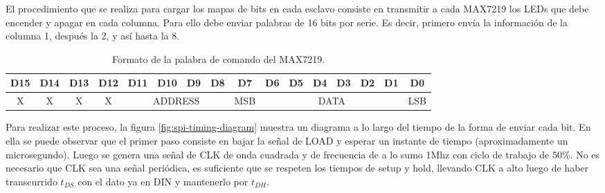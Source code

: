 El procedimiento que se realiza para cargar los mapas de bits en cada esclavo consiste en transmitir a cada MAX7219 los LEDs que debe encender y apagar en cada columna. Para ello debe enviar palabras de 16 bits por serie. Es decir, primero envía la información de la columna 1, después la 2, y así hasta la 8.

\begin{table}[ht!]
	\centering
	\caption{Formato de la palabra de comando del MAX7219.}
	\label{table:trama-spi}
	\begin{adjustbox}{max width=\textwidth}
	\begin{tabular}{|c|c|c|c|c|c|c|c|c|c|c|c|c|c|c|c|}
	\hline
	D15 & D14 & D13 & D12 & D11   & D10   & D9   & D8   & D7 & D6 & D5 & D4 & D3 & D2 & D1 & D0 \\ \hline
	X   & X   & X   & X   & \multicolumn{4}{c|}{ADDRESS} & \multicolumn{1}{c}{ MSB } & \multicolumn{6}{c}{ DATA } & \multicolumn{1}{c|}{ LSB } \\ \hline
	\end{tabular}
	\end{adjustbox}
\end{table}

Para realizar este proceso, la figura \ref{fig:spi-timing-diagram} muestra un diagrama a lo largo del tiempo de la forma de enviar cada bit. En ella se puede observar que el primer paso consiste en bajar la señal de LOAD y esperar un instante de tiempo (aproximadamente un microsegundo). Luego se genera una señal de CLK de onda cuadrada y de frecuencia de a lo sumo 1Mhz con ciclo de trabajo de $50 \%$. No es necesario que CLK sea una señal periódica, es suficiente que se respeten los tiempos de setup y hold, llevando CLK a alto luego de haber transcurrido $t_{DS}$ con el dato ya en DIN y mantenerlo por $t_{DH}$.


